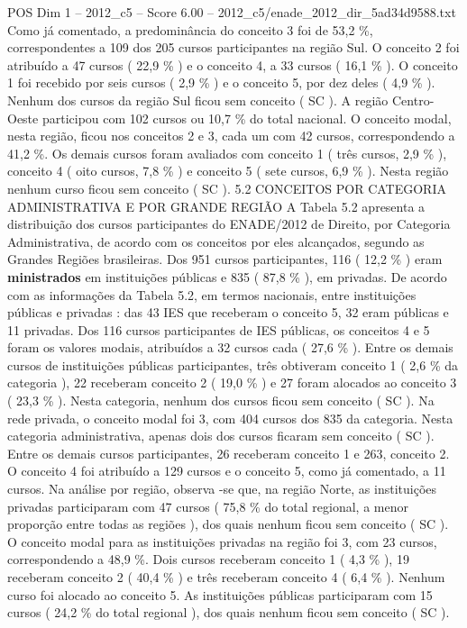 \begin{textsample}{POS Dim 1 – 2012\_c5 – Score 6.00 – 2012\_c5/enade\_2012\_dir\_5ad34d9588.txt}
Como já comentado, a predominância do conceito 3 foi de 53,2 \%, correspondentes a 109 dos 205 cursos participantes na região Sul.
O conceito 2 foi atribuído a 47 cursos ( 22,9 \% ) e o conceito 4, a 33 cursos ( 16,1 \% ).
O conceito 1 foi recebido por seis cursos ( 2,9 \% ) e o conceito 5, por dez deles ( 4,9 \% ).
Nenhum dos cursos da região Sul ficou sem conceito ( SC ).
A região Centro-Oeste participou com 102 cursos ou 10,7 \% do total nacional.
O conceito modal, nesta região, ficou nos conceitos 2 e 3, cada um com 42 cursos, correspondendo a 41,2 \%.
Os demais cursos foram avaliados com conceito 1 ( três cursos, 2,9 \% ), conceito 4 ( oito cursos, 7,8 \% ) e conceito 5 ( sete cursos, 6,9 \% ).
Nesta região nenhum curso ficou sem conceito ( SC ). 5.2 CONCEITOS POR CATEGORIA ADMINISTRATIVA E POR GRANDE REGIÃO A Tabela 5.2 apresenta a distribuição dos cursos participantes do ENADE/2012 de Direito, por Categoria Administrativa, de acordo com os conceitos por eles alcançados, segundo as Grandes Regiões brasileiras.
Dos 951 cursos participantes, 116 ( 12,2 \% ) eram \textbf{ministrados} em instituições públicas e 835 ( 87,8 \% ), em privadas.
De acordo com as informações da Tabela 5.2, em termos nacionais, entre instituições públicas e privadas : das 43 IES que receberam o conceito 5, 32 eram públicas e 11 privadas.
Dos 116 cursos participantes de IES públicas, os conceitos 4 e 5 foram os valores modais, atribuídos a 32 cursos cada ( 27,6 \% ).
Entre os demais cursos de instituições públicas participantes, três obtiveram conceito 1 ( 2,6 \% da categoria ), 22 receberam conceito 2 ( 19,0 \% ) e 27 foram alocados ao conceito 3 ( 23,3 \% ).
Nesta categoria, nenhum dos cursos ficou sem conceito ( SC ).
Na rede privada, o conceito modal foi 3, com 404 cursos dos 835 da categoria.
Nesta categoria administrativa, apenas dois dos cursos ficaram sem conceito ( SC ).
Entre os demais cursos participantes, 26 receberam conceito 1 e 263, conceito 2.
O conceito 4 foi atribuído a 129 cursos e o conceito 5, como já comentado, a 11 cursos.
Na análise por região, observa -se que, na região Norte, as instituições privadas participaram com 47 cursos ( 75,8 \% do total regional, a menor proporção entre todas as regiões ), dos quais nenhum ficou sem conceito ( SC ).
O conceito modal para as instituições privadas na região foi 3, com 23 cursos, correspondendo a 48,9 \%.
Dois cursos receberam conceito 1 ( 4,3 \% ), 19 receberam conceito 2 ( 40,4 \% ) e três receberam conceito 4 ( 6,4 \% ).
Nenhum curso foi alocado ao conceito 5.
As instituições públicas participaram com 15 cursos ( 24,2 \% do total regional ), dos quais nenhum ficou sem conceito ( SC ).

\end{textsample}
